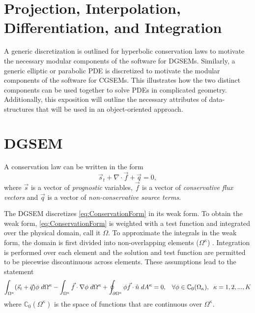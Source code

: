 \documentclass[12pt]{softwaremanual}
\begin{document}
\section{Projection, Interpolation, Differentiation, and Integration}

A generic discretization is outlined for hyperbolic conservation laws to motivate the necessary modular components of the software for DGSEMs. Similarly, a generic elliptic or parabolic PDE is discretized to motivate the modular components of the software for CGSEMs. This illustrates how the two distinct components can be used together to solve PDEs in complicated geometry. Additionally, this exposition will outline the necessary attributes of data-structures that will be used in an object-oriented approach.

\section{DGSEM}\label{sec:DGSEMtheory}
A conservation law can be written in the form
  \begin{equation}
 \vec{s}_t + \nabla \cdot \vec{f} + \vec{q} = 0, \label{eq:ConservationForm}
 \end{equation}
 where $\vec{s}$ is a vector of \textit{prognostic} variables, $\vec{f}$ is a vector of \textit{conservative flux vectors} and $\vec{q}$ is a vector of \textit{non-conservative source terms}.
 
The DGSEM discretizes \eqref{eq:ConservationForm} in its weak form. To obtain the weak form, \eqref{eq:ConservationForm} is weighted with a test function and integrated over the physical domain, call it $\Omega$. To approximate the integrals in the weak form, the domain is first divided into non-overlapping elements  ($\Omega^\kappa$) . Integration is performed over each element and the solution and test function are permitted to be piecewise discontinuous across elements. These assumptions lead to the statement
  \begin{equation}
  \int_{\Omega^\kappa} (\vec{s}_t + \vec{q} )\phi \hspace{1mm} d\Omega^\kappa  - \int_{\Omega^\kappa} \vec{f} \cdot \nabla \phi \hspace{1mm} d\Omega^\kappa + \oint_{\partial \Omega^\kappa} \phi \vec{f}\cdot \hat{n} \hspace{1mm} d A^\kappa = 0, \hspace{3mm} \forall \phi \in \mathbb{C}_0(\Omega_\kappa), \hspace{2mm} \kappa=1,2,...,K \label{eq:weakForm}
  \end{equation}
where $\mathbb{C}_0(\Omega^\kappa)$ is the space of functions that are continuous over $\Omega^\kappa$.
\end{document}
